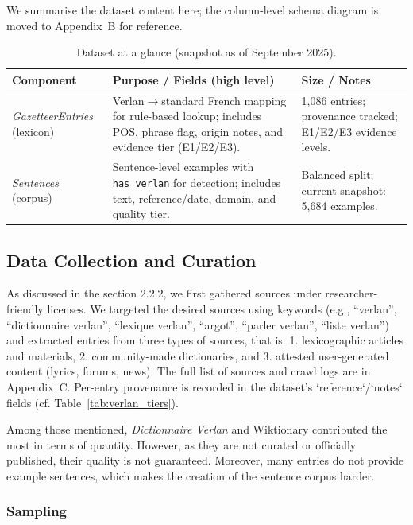 \documentclass[12pt]{article}
\begin{document}
We summarise the dataset content here; the column-level schema diagram is moved to Appendix~B for reference.

\begin{table}[H]
\centering
\caption{Dataset at a glance (snapshot as of September 2025).}
\begin{tabular}{p{3.6cm} p{7.2cm} p{3.6cm}}
\hline
\textbf{Component} & \textbf{Purpose / Fields (high level)} & \textbf{Size / Notes} \\
\hline
\textit{GazetteerEntries} (lexicon) & Verlan$\rightarrow$standard French mapping for rule-based lookup; includes POS, phrase flag, origin notes, and evidence tier (E1/E2/E3). & 1,086 entries; provenance tracked; E1/E2/E3 evidence levels. \\
\textit{Sentences} (corpus) & Sentence-level examples with \texttt{has\_verlan} for detection; includes text, reference/date, domain, and quality tier. & Balanced split; current snapshot: 5,684 examples. \\
\hline
\end{tabular}
\label{tab:dataset-glance}
\end{table}


\subsection{Data Collection and Curation}
As discussed in the section 2.2.2, we first gathered sources under researcher-friendly licenses. We targeted the desired sources using keywords (e.g., ``verlan'', ``dictionnaire verlan'', ``lexique verlan'', ``argot'', ``parler verlan'', ``liste verlan'') and extracted entries from three types of sources, that is: 1. lexicographic articles and materials, 2. community-made dictionaries, and 3. attested user-generated content (lyrics, forums, news). The full list of sources and crawl logs are in Appendix~C. Per-entry provenance is recorded in the dataset's `reference`/`notes` fields (cf. Table~\ref{tab:verlan_tiers}).

Among those mentioned, \textit{Dictionnaire Verlan} and Wiktionary contributed the most in terms of quantity. However, as they are not curated or officially published, their quality is not guaranteed. Moreover, many entries do not provide example sentences, which makes the creation of the sentence corpus harder.

\subsubsection{Sampling}
\end{document}
